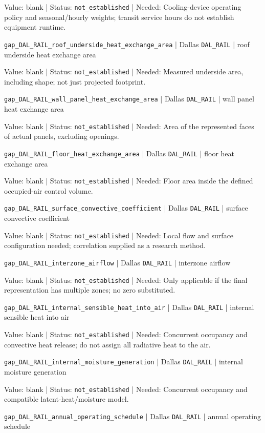 Value: blank | Status: \nolinkurl{not_established} | Needed: Cooling-device operating policy and seasonal/hourly weights; transit service hours do not establish equipment runtime.

\nolinkurl{gap_DAL_RAIL_roof_underside_heat_exchange_area} | Dallas \nolinkurl{DAL_RAIL}  | roof underside heat exchange area

Value: blank | Status: \nolinkurl{not_established} | Needed: Measured underside area, including shape; not just projected footprint.

\nolinkurl{gap_DAL_RAIL_wall_panel_heat_exchange_area} | Dallas \nolinkurl{DAL_RAIL}  | wall panel heat exchange area

Value: blank | Status: \nolinkurl{not_established} | Needed: Area of the represented faces of actual panels, excluding openings.

\nolinkurl{gap_DAL_RAIL_floor_heat_exchange_area} | Dallas \nolinkurl{DAL_RAIL}  | floor heat exchange area

Value: blank | Status: \nolinkurl{not_established} | Needed: Floor area inside the defined occupied-air control volume.

\nolinkurl{gap_DAL_RAIL_surface_convective_coefficient} | Dallas \nolinkurl{DAL_RAIL}  | surface convective coefficient

Value: blank | Status: \nolinkurl{not_established} | Needed: Local flow and surface configuration needed; correlation supplied as a research method.

\nolinkurl{gap_DAL_RAIL_interzone_airflow} | Dallas \nolinkurl{DAL_RAIL}  | interzone airflow

Value: blank | Status: \nolinkurl{not_established} | Needed: Only applicable if the final representation has multiple zones; no zero substituted.

\nolinkurl{gap_DAL_RAIL_internal_sensible_heat_into_air} | Dallas \nolinkurl{DAL_RAIL}  | internal sensible heat into air

Value: blank | Status: \nolinkurl{not_established} | Needed: Concurrent occupancy and convective heat release; do not assign all radiative heat to the air.

\nolinkurl{gap_DAL_RAIL_internal_moisture_generation} | Dallas \nolinkurl{DAL_RAIL}  | internal moisture generation

Value: blank | Status: \nolinkurl{not_established} | Needed: Concurrent occupancy and compatible latent-heat/moisture model.

\nolinkurl{gap_DAL_RAIL_annual_operating_schedule} | Dallas \nolinkurl{DAL_RAIL}  | annual operating schedule

